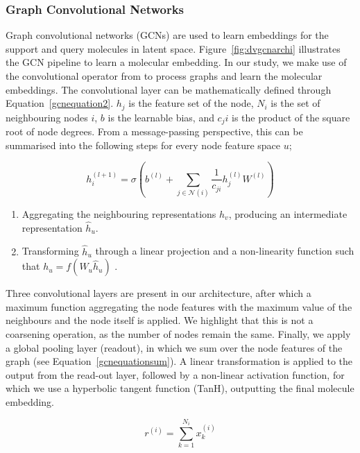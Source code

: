 \subsubsection{Graph Convolutional Networks}

Graph convolutional networks (GCNs) are used to learn embeddings for the support and query molecules in latent space. Figure~\ref{fig:dvgcnarchi} illustrates the GCN pipeline to learn a molecular embedding. In our study, we make use of the convolutional operator from \citet{kipf2016semi} to process graphs and learn the molecular embeddings. The convolutional layer can be mathematically defined through Equation~\ref{gcnequation2}. $h_j$ is the feature set of the node, $N_i$ is the set of neighbouring nodes $i$, $b$ is the learnable bias, and $c_ji$ is the product of the square root of node degrees. From a message-passing perspective, this can be summarised into the following steps for every node feature space $u$;

\begin{equation}
	\label{gcnequation2}
	h_i^{(l+1)} = \sigma(b^{(l)} + \sum_{j\in\mathcal{N}(i)}\frac{1}{c_{ji}}h_j^{(l)}W^{(l)})
\end{equation}

\begin{enumerate}
	\item Aggregating the neighbouring representations $h_v$, producing an intermediate representation $\hat{h}_u$.
	\item Transforming $\hat{h}_u$ through a linear projection and a non-linearity function such that $h_u = f(W_u \hat{h}_u)$ \citep{kipf2016semi}.
\end{enumerate}

Three convolutional layers are present in our architecture, after which a maximum function aggregating the node features with the maximum value of the neighbours and the node itself is applied. We highlight that this is not a coarsening operation, as the number of nodes remain the same. Finally, we apply a global pooling layer (readout), in which we sum over the node features of the graph (see Equation~\ref{gcnequationsum}). A linear transformation is applied to the output from the read-out layer, followed by a non-linear activation function, for which we use a hyperbolic tangent function (TanH), outputting the final molecule embedding.

\begin{equation}
	\label{gcnequationsum}
	r^{(i)} = \sum_{k=1}^{N_i} x^{(i)}_k
\end{equation}



